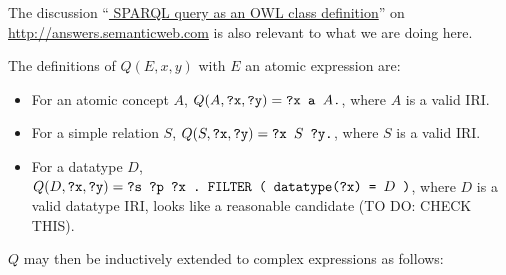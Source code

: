 \documentclass[a4paper]{article}
\newcounter{ex}
\begin{document}
The discussion
``\href{http://answers.semanticweb.com/questions/11697/sparql-query-as-an-owl-class-definition}{%
SPARQL query as an OWL class definition}'' on \url{http://answers.semanticweb.com}
is also relevant to what we are doing here.

The definitions of $Q(E, x, y)$ with $E$ an atomic expression are:
\begin{itemize}
\item For an atomic concept $A$, $Q(A, \mbox{\tt ?x}, \mbox{\tt ?y}) = \mbox{\tt ?x a }A\mbox{\tt .}$,
  where $A$ is a valid IRI.
\item For a simple relation $S$, $Q(S, \mbox{\tt ?x}, \mbox{\tt ?y}) = \mbox{\tt ?x }S\mbox{\tt\ ?y.}$,
  where $S$ is a valid IRI.
\item For a datatype $D$, $Q(D, \mbox{\tt ?x}, \mbox{\tt ?y}) =
  \mbox{\tt ?s ?p ?x .\ FILTER ( datatype(?x) = }D\mbox{\tt\ )}$,
  where $D$ is a valid datatype IRI,
  looks like a reasonable candidate (TO DO: CHECK THIS).
\end{itemize}
$Q$ may then be inductively extended to complex expressions as follows:
\end{document}
